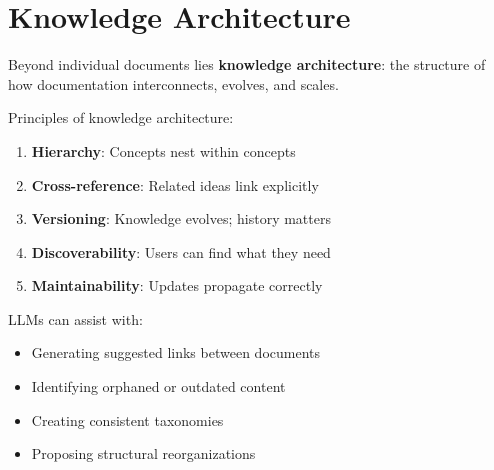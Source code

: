 \chapter{Knowledge Architecture}

Beyond individual documents lies \textbf{knowledge architecture}: the structure of how documentation interconnects, evolves, and scales.

Principles of knowledge architecture:

\begin{enumerate}
    \item \textbf{Hierarchy}: Concepts nest within concepts
    \item \textbf{Cross-reference}: Related ideas link explicitly
    \item \textbf{Versioning}: Knowledge evolves; history matters
    \item \textbf{Discoverability}: Users can find what they need
    \item \textbf{Maintainability}: Updates propagate correctly
\end{enumerate}

LLMs can assist with:

\begin{itemize}
    \item Generating suggested links between documents
    \item Identifying orphaned or outdated content
    \item Creating consistent taxonomies
    \item Proposing structural reorganizations
\end{itemize}
